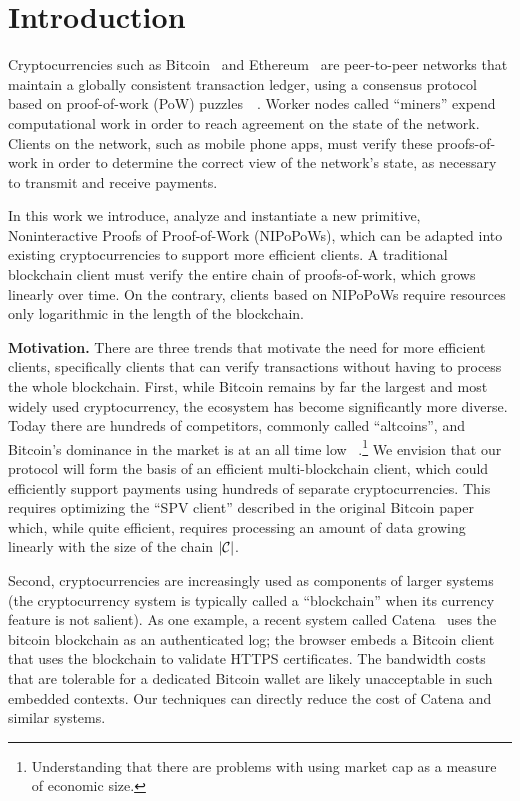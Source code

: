 \section{Introduction}

Cryptocurrencies such as Bitcoin~\cite{bitcoin}\cite{bitcoinsoftware} and
Ethereum~\cite{ethereum} are
peer-to-peer networks that maintain a globally consistent transaction ledger,
using a consensus protocol based on proof-of-work (PoW)
puzzles~\cite{pow}~\cite{hashcash}. Worker nodes called ``miners'' expend
computational work in order to reach agreement on the state of the network.
Clients on the network, such as mobile phone apps, must verify these
proofs-of-work in order to determine the correct view of the network's state, as
necessary to transmit and receive payments.

In this work we introduce, analyze and instantiate a new primitive,
Noninteractive Proofs of Proof-of-Work (NIPoPoWs), which can be adapted into
existing cryptocurrencies to support more efficient clients. A traditional
blockchain client must verify the entire chain of proofs-of-work, which grows
linearly over time. On the contrary, clients based on NIPoPoWs require resources
only logarithmic in the length of the blockchain.

\textbf{Motivation.}
There are three trends that motivate the need for more efficient clients,
specifically clients that can verify transactions without having to process the
whole blockchain. First, while Bitcoin remains by far the largest and most
widely used cryptocurrency, the ecosystem has become significantly more diverse.
Today there are hundreds of competitors, commonly called ``altcoins'', and
Bitcoin's dominance in the market is at an all time low
~\cite{marketcap}.\footnote{Understanding that there are problems with using
market cap as a measure of economic size.} We envision that our protocol will
form the basis of an efficient multi-blockchain client, which could efficiently
support payments using hundreds of separate cryptocurrencies. This requires
optimizing the ``SPV client'' described in the original Bitcoin
paper~\cite{bitcoin} which, while quite efficient, requires processing an amount
of data growing linearly with the size of the chain $|\mathcal{C}|$.

Second, cryptocurrencies are increasingly used as components of larger systems
(the cryptocurrency system is typically called a ``blockchain'' when its
currency feature is not salient). As one example, a recent system called
Catena~\cite{catena} uses the bitcoin blockchain as an authenticated log; the
browser embeds a Bitcoin client that uses the blockchain to validate HTTPS
certificates. The bandwidth costs that are tolerable for a dedicated Bitcoin
wallet are likely unacceptable in such embedded contexts. Our techniques can
directly reduce the cost of Catena and similar systems.

